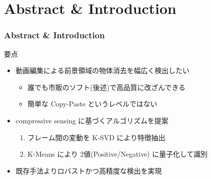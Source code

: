 \section{Abstract \& Introduction}
\begin{frame}\frametitle{Abstract \& Introduction}
要点
\begin{itemize}
    \item 動画編集による前景領域の物体消去を幅広く検出したい
    \begin{itemize}
        \item 誰でも市販のソフト(後述)で高品質に改ざんできる
        \item 簡単な Copy-Paste というレベルではない
    \end{itemize}
    \item compressive sensing に基づくアルゴリズムを提案
    \begin{enumerate}
        \item フレーム間の変動を K-SVD により特徴抽出
        \item K-Means により 2値(Positive/Negative) に量子化して識別
    \end{enumerate}
    \item 既存手法よりロバストかつ高精度な検出を実現
\end{itemize}
\end{frame}
